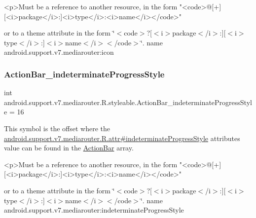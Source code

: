 \begin{DoxyVerb}      <p>Must be a reference to another resource, in the form "<code>@[+][<i>package</i>:]<i>type</i>:<i>name</i></code>"
\end{DoxyVerb}
 or to a theme attribute in the form \char`\"{}$<$code$>$?\mbox{[}$<$i$>$package$<$/i$>$\+:\mbox{]}\mbox{[}$<$i$>$type$<$/i$>$\+:\mbox{]}$<$i$>$name$<$/i$>$$<$/code$>$\char`\"{}.  name android.\+support.\+v7.\+mediarouter\+:icon \mbox{\label{classandroid_1_1support_1_1v7_1_1mediarouter_1_1R_1_1styleable_af9e24d848119a9a402fa2fd5a9966125}} 
\subsubsection{\texorpdfstring{Action\+Bar\+\_\+indeterminate\+Progress\+Style}{ActionBar\_indeterminateProgressStyle}}
{\footnotesize\ttfamily int android.\+support.\+v7.\+mediarouter.\+R.\+styleable.\+Action\+Bar\+\_\+indeterminate\+Progress\+Style = 16\hspace{0.3cm}{\ttfamily [static]}}

This symbol is the offset where the \hyperlink{classandroid_1_1support_1_1v7_1_1mediarouter_1_1R_1_1attr_a21cd5b179ec241544f87b4e808a38dca}{android.\+support.\+v7.\+mediarouter.\+R.\+attr\#indeterminate\+Progress\+Style} attribute\textquotesingle{}s value can be found in the \hyperlink{classandroid_1_1support_1_1v7_1_1mediarouter_1_1R_1_1styleable_adc4d3c0d096085367f12d025007aa53f}{Action\+Bar} array.

\begin{DoxyVerb}      <p>Must be a reference to another resource, in the form "<code>@[+][<i>package</i>:]<i>type</i>:<i>name</i></code>"
\end{DoxyVerb}
 or to a theme attribute in the form \char`\"{}$<$code$>$?\mbox{[}$<$i$>$package$<$/i$>$\+:\mbox{]}\mbox{[}$<$i$>$type$<$/i$>$\+:\mbox{]}$<$i$>$name$<$/i$>$$<$/code$>$\char`\"{}.  name android.\+support.\+v7.\+mediarouter\+:indeterminate\+Progress\+Style \mbox{\label{classandroid_1_1support_1_1v7_1_1mediarouter_1_1R_1_1styleable_a12d3d9b42458f497ce5fb06b1d183a09}} 
